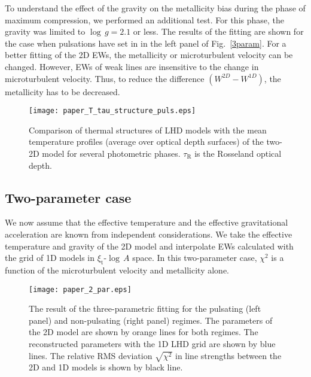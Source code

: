 \documentclass{aa}
\begin{document}
To understand the effect of the gravity on the metallicity bias during the phase
of maximum compression, we performed an additional test.  For this phase, the
gravity was limited to $\log\,g=2.1$ or less. The results of the fitting are
shown for the case when pulsations have set in in the left panel of
Fig.~\ref{3param}.  For a better fitting of the 2D EWs, the metallicity or microturbulent velocity can be changed.  However, EWs of weak lines
are insensitive to the change in microturbulent velocity. Thus, to reduce
the difference $(W^{2D}-W^{1D})$, the metallicity has
to be decreased.


\begin{figure}
\texttt{[image: paper\_T\_tau\_structure\_puls.eps]}
\caption{Comparison of thermal structures of LHD models with the mean
  temperature profiles (average over optical depth surfaces) of the
  two-2D model for several photometric phases. $\tau_\mathrm{R}$ is
  the Rosseland optical depth.}
\label{therm_struct3}
\end{figure} 

   
   
\subsection{Two-parameter case}

We now assume that the effective temperature and the effective gravitational
acceleration are known from independent considerations.  We take the effective
temperature and gravity of the 2D model and interpolate EWs
calculated with the grid of 1D models in $\xi_\mathrm{t}$-$\log\,A$ space. In
this two-parameter case,  $\chi^2$ is a function of the microturbulent
velocity and metallicity alone.
 
 
\begin{figure*}
\texttt{[image: paper\_2\_par.eps]}
\caption{The result of the three-parametric fitting for 
   the pulsating (left panel) and non-pulsating (right panel) 
   regimes. The parameters of the 2D model are shown by  orange 
lines for both regimes. The reconstructed parameters with the 1D LHD grid 
are shown by blue lines.  The relative RMS deviation $\sqrt{\chi^2}$ in  
line strengths  between the 2D  and 1D models is shown by black line. }
\label{2param}
\end{figure*} 
   
\end{document}
